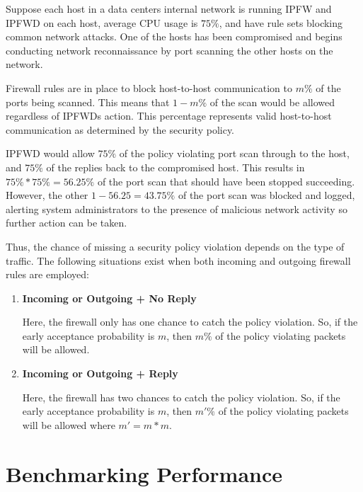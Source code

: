\documentclass[journal]{IEEEtran}
\begin{document}
    Suppose each host in a data centers internal network is running IPFW and
    IPFWD on each host, average CPU usage is $75\%$, and have rule sets
    blocking common network attacks. One of the hosts has been compromised and
    begins conducting network reconnaissance by port scanning the other hosts
    on the network. 

    Firewall rules are in place to block host-to-host communication to $m\%$ of
    the ports being scanned. This means that $1 - m\%$ of the scan would be
    allowed regardless of IPFWDs action. This percentage represents valid
    host-to-host communication as determined by the security policy.

    IPFWD would allow $75\%$ of the policy violating port scan through to the
    host, and $75\%$ of the replies back to the compromised host. This results
    in $75\% * 75\% = 56.25\%$ of the port scan that should have been stopped
    succeeding.  However, the other $1 - 56.25 = 43.75\%$ of the port scan was
    blocked and logged, alerting system administrators to the presence of
    malicious network activity so further action can be taken.

  Thus, the chance of missing a security policy violation depends on the type
  of traffic. The following situations exist when both incoming and outgoing
  firewall rules are employed:

  \begin{enumerate}

    \item \textbf{Incoming or Outgoing + No Reply}

      Here, the firewall only has one chance to catch the policy violation.
      So, if the early acceptance probability is $m$, then $m\%$ of the policy
      violating packets will be allowed.

    \item \textbf{Incoming or Outgoing + Reply}

      Here, the firewall has two chances to catch the policy violation. So,
      if the early acceptance probability is $m$, then $m'\%$ of the policy
      violating packets will be allowed where $m' = m * m$.

  \end{enumerate}


\section{Benchmarking Performance}
\end{document}
